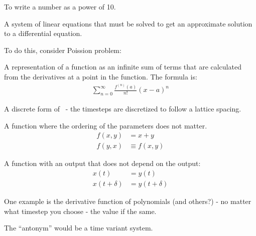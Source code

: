 \begin{definition}[Flow]
\begin{definition}
\end{definition}

\begin{definition}
    To write a number as a power of 10.
\end{definition}

\begin{definition}
    A system of linear equations that must be solved to get an approximate
    solution to a differential equation.

    To do this, consider Poission problem:
\end{definition}

\begin{definition}
    A representation of a function as an infinite sum of terms that are 
    calculated from the derivatives at a point in the function.
    The formula is:
    \begin{align}
        \sum\limits_{n=0}^{\infty}{\frac{f^{(n)}(a)}{n!}{(x-a)}^{n}}
    \end{align}
\end{definition}

\begin{definition}
    A discrete form of~ - the timesteps are discretized to follow
    a lattice spacing.
\end{definition}

\begin{definition}
    A function where the ordering of the parameters does not matter.
    \begin{align}
        f(x,y) &= x + y \\
        f(y,x) &\equiv f(x,y)
    \end{align}
\end{definition}

\begin{definition}\label{TIS}
    A function with an output that does not depend on the output:
    \begin{align}
        x(t) &= y(t) \\
        x(t + \delta) &= y(t + \delta)
    \end{align}

    One example is the derivative function of polynomials (and others?) -
    no matter what timestep you choose - the value if the same.

    The ``antonym'' would be a time variant system.
\end{definition}


\end{definition}
